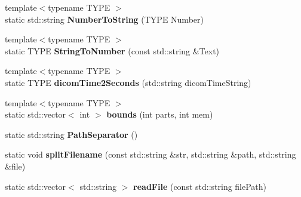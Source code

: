 \begin{DoxyCompactItemize}
\item 
\hypertarget{class_k_w_util_a10aaa83c83c801ef07c95a29e1acdc4e}{{\footnotesize template$<$typename T\-Y\-P\-E $>$ }\\static std\-::string {\bfseries Number\-To\-String} (T\-Y\-P\-E Number)}\label{class_k_w_util_a10aaa83c83c801ef07c95a29e1acdc4e}

\item 
\hypertarget{class_k_w_util_adea4c36750f518d1f2c90af14742a0f6}{{\footnotesize template$<$typename T\-Y\-P\-E $>$ }\\static T\-Y\-P\-E {\bfseries String\-To\-Number} (const std\-::string \&Text)}\label{class_k_w_util_adea4c36750f518d1f2c90af14742a0f6}

\item 
\hypertarget{class_k_w_util_a21813a6377e55fa15c70f64afb2feb51}{{\footnotesize template$<$typename T\-Y\-P\-E $>$ }\\static T\-Y\-P\-E {\bfseries dicom\-Time2\-Seconds} (std\-::string dicom\-Time\-String)}\label{class_k_w_util_a21813a6377e55fa15c70f64afb2feb51}

\item 
\hypertarget{class_k_w_util_a498350d10204849240a945ea682ecc98}{{\footnotesize template$<$typename T\-Y\-P\-E $>$ }\\static std\-::vector$<$ int $>$ {\bfseries bounds} (int parts, int mem)}\label{class_k_w_util_a498350d10204849240a945ea682ecc98}

\item 
\hypertarget{class_k_w_util_a19d7a4b4320a3b9d8ff06e4d296e2893}{static std\-::string {\bfseries Path\-Separator} ()}\label{class_k_w_util_a19d7a4b4320a3b9d8ff06e4d296e2893}

\item 
\hypertarget{class_k_w_util_afe6ad66b5fe06a8b42918634076ab056}{static void {\bfseries split\-Filename} (const std\-::string \&str, std\-::string \&path, std\-::string \&file)}\label{class_k_w_util_afe6ad66b5fe06a8b42918634076ab056}

\item 
\hypertarget{class_k_w_util_a70a639cebc8982645a9ba44f73b93d85}{static std\-::vector$<$ std\-::string $>$ {\bfseries read\-File} (const std\-::string file\-Path)}\label{class_k_w_util_a70a639cebc8982645a9ba44f73b93d85}

\end{DoxyCompactItemize}


